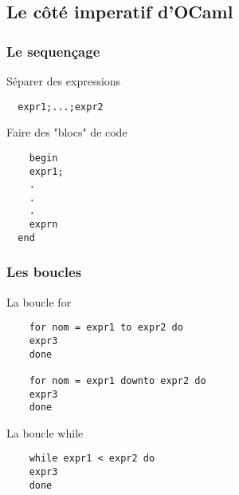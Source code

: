 \subsection{Le côté imperatif d'OCaml} %

\begin{frame}[fragile]
	\frametitle{Le sequençage}
		\begin{block}{Séparer des expressions}
		\begin{lstlisting}
  expr1;...;expr2
		\end{lstlisting}
		\end{block}
		\begin{block}{Faire des "blocs" de code}
		\begin{lstlisting}
    begin
    expr1; 
    .
    .
    .
    exprn
  end
		\end{lstlisting}
		\end{block}
\end{frame}

\begin{frame}[fragile]
    \frametitle{Les boucles}
    \begin{block}{La boucle for}
	\begin{lstlisting}
	for nom = expr1 to expr2 do 
	expr3
	done

	for nom = expr1 downto expr2 do
	expr3
	done
	\end{lstlisting}
      \end{block}
	\begin{block}{La boucle while}
	\begin{lstlisting}
	while expr1 < expr2 do
	expr3
	done
      \end{lstlisting}
  \end{block}
\end{frame}

